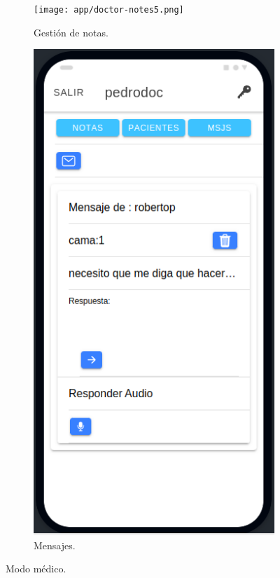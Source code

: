 \begin{figure}[!htpb]
\begin{subfigure}[b]{0.3\textwidth}
     \end{subfigure}
     \hfill
     \begin{subfigure}[b]{0.3\textwidth}
         \centering
         \texttt{[image: app/doctor-notes5.png]}
         \caption{Gestión de notas.}
         \label{fig_1:2de3}
     \end{subfigure}
     \hfill
     \begin{subfigure}[b]{0.3\textwidth}
         \centering
         \includegraphics[width=.95\textwidth]{./Figures/app/doctor-message-audio.png}
         \caption{Mensajes.}
         \label{fig_1:3de3}
     \end{subfigure}
        \caption{Modo médico.}
        \label{fig:Modo médico}
\end{figure}

